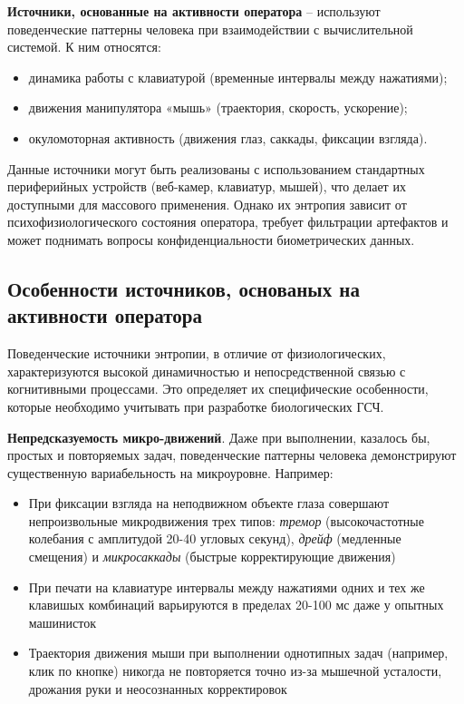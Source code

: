 \documentclass[14pt, a4paper]{extreport}
\begin{document}
\textbf{Источники, основанные на активности оператора} – используют поведенческие паттерны человека при взаимодействии с вычислительной системой. К ним относятся:
\begin{itemize}
    \item динамика работы с клавиатурой (временные интервалы между нажатиями);
    \item движения манипулятора «мышь» (траектория, скорость, ускорение);
    \item окуломоторная активность (движения глаз, саккады, фиксации взгляда).
\end{itemize}
Данные источники могут быть реализованы с использованием стандартных периферийных устройств (веб-камер, клавиатур, мышей), что делает их доступными для массового применения. Однако их энтропия зависит от психофизиологического состояния оператора, требует фильтрации артефактов и может поднимать вопросы конфиденциальности биометрических данных.

\subsection{Особенности источников, основаных на активности оператора}

Поведенческие источники энтропии, в отличие от физиологических, характеризуются высокой динамичностью и непосредственной связью с когнитивными процессами. Это определяет их специфические особенности, которые необходимо учитывать при разработке биологических ГСЧ.

\textbf{Непредсказуемость микро-движений}. Даже при выполнении, казалось бы, простых и повторяемых задач, поведенческие паттерны человека демонстрируют существенную вариабельность на микроуровне. Например:
\begin{itemize}
    \item При фиксации взгляда на неподвижном объекте глаза совершают непроизвольные микродвижения трех типов: \textit{тремор} (высокочастотные колебания с амплитудой 20-40 угловых секунд), \textit{дрейф} (медленные смещения) и \textit{микросаккады} (быстрые корректирующие движения)
    \item При печати на клавиатуре интервалы между нажатиями одних и тех же клавишых комбинаций варьируются в пределах 20-100 мс даже у опытных машинисток
    \item Траектория движения мыши при выполнении однотипных задач (например, клик по кнопке) никогда не повторяется точно из-за мышечной усталости, дрожания руки и неосознанных корректировок
\end{itemize}
\end{document}
